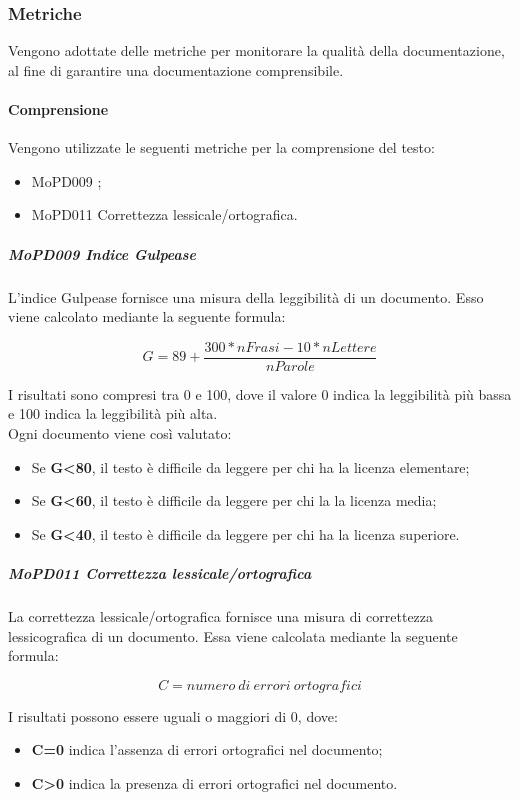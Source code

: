 \documentclass[../norme-di-progetto.tex]{subfiles}
\begin{document}
\subsubsection{Metriche}
Vengono adottate delle metriche per monitorare la qualità della documentazione, al fine di garantire una documentazione comprensibile.
\paragraph{Comprensione}
Vengono utilizzate le seguenti metriche per la comprensione del testo:
\begin{itemize}
  \item MoPD009 ;
  \item MoPD011 Correttezza lessicale/ortografica.
\end{itemize}
\subparagraph{MoPD009 Indice Gulpease}
L'indice Gulpease fornisce una misura della leggibilità di un documento. Esso viene calcolato mediante la seguente formula:
\begin{center}
  \centering
  \begin{displaymath}
    G=89+\frac{300*nFrasi - 10*nLettere}{nParole}
  \end{displaymath}
\end{center}
I risultati sono compresi tra 0 e 100, dove il valore 0 indica la leggibilità più bassa e 100 indica la leggibilità più alta. \\
Ogni documento viene così valutato:
\begin{itemize}
  \item Se \textbf{G\textless 80}, il testo è difficile da leggere per chi ha la licenza elementare;
  \item Se \textbf{G\textless 60}, il testo è difficile da leggere per chi la la licenza media;
  \item Se \textbf{G\textless 40}, il testo è difficile da leggere per chi ha la licenza superiore.
\end{itemize}

\subparagraph{MoPD011 Correttezza lessicale/ortografica}
La correttezza lessicale/ortografica fornisce una misura di correttezza lessicografica di un documento. Essa viene calcolata mediante la seguente formula:
\begin{center}
  \centering
  \begin{displaymath}
    C=numero\ di\ errori\ ortografici
  \end{displaymath}
\end{center}
I risultati possono essere uguali o maggiori di 0, dove:
\begin{itemize}
  \item \textbf{C=0} indica l'assenza di errori ortografici nel documento;
  \item \textbf{C\textgreater 0} indica la presenza di errori ortografici nel documento.
\end{itemize}
\end{document}

